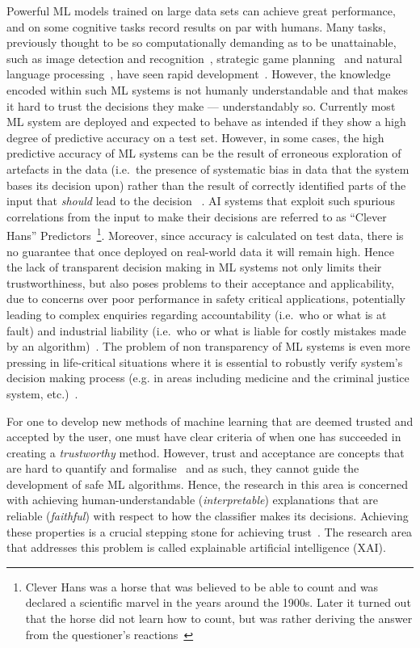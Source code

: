 Powerful ML models trained on large data sets can achieve great performance, and on some cognitive tasks record results on par with humans. Many tasks, previously thought to be so computationally demanding as to be unattainable, such as image detection and recognition~\cite{HeZRS16}, strategic game planning~\cite{SilverHMGSDSAPL16} and natural language processing~\cite{DengHK13}, have seen rapid development~\cite{LeCunBH15}. However, the knowledge encoded within such ML systems is not humanly understandable and that makes it hard to trust the decisions they make — understandably so. Currently most ML system are deployed and expected to behave as intended if they show a high degree of predictive accuracy on a test set. However, in some cases, the high predictive accuracy of  ML systems can be the result of erroneous exploration of artefacts in the data (i.e.\ the presence of systematic bias in data that the system bases its decision upon) rather than the result of correctly identified parts of the input that \textit{should} lead to the decision ~\cite{leek2010tackling, SzegedyZSBEGF13, corr, taylor2006methods}. AI systems that exploit such spurious correlations from the input to make their decisions are referred to as ``Clever Hans'' Predictors~\footnote{Clever Hans was a horse that was believed to be able to count and was declared a scientific marvel in the years around the 1900s. Later it turned out that the horse did not learn how to count, but was rather deriving the answer from the questioner's reactions~\cite{lapuschkin2019unmasking}}. Moreover, since accuracy is calculated on test data, there is no guarantee that once deployed on real-world data it will remain high. Hence the lack of transparent decision making in ML systems not only limits their trustworthiness, but also poses problems to their acceptance and applicability, due to concerns over poor performance in safety critical applications, potentially leading to complex enquiries regarding accountability (i.e.\ who or what is at fault) and industrial liability (i.e.\ who or what is liable for costly mistakes made by an algorithm)~\cite{NguyenHHTK14, abs, kucharski2016study, WolfMG17}. The problem of non transparency of ML systems is even more pressing in life-critical situations where it is essential to robustly verify system's decision making process (e.g. in areas including medicine and the criminal justice system, etc.)~\cite{CaruanaLGKSE15, BojarskiYCCFJM17}.


For one to develop new methods of machine learning that are deemed trusted and accepted by the user, one must have clear criteria of when one has succeeded in creating a \textit{trustworthy} method. However, trust and acceptance are concepts that are hard to quantify and formalise~\cite{doshi2017towards, Lipton18} and as such, they cannot guide the development of safe ML algorithms. Hence, the research in this area is concerned with achieving human-understandable (\textit{interpretable}) explanations that are reliable (\textit{faithful}) with respect to how the classifier makes its decisions. Achieving these properties is a crucial stepping stone for achieving trust~\cite{Lipton18}. The research area that addresses this problem is called explainable artificial intelligence (XAI).


